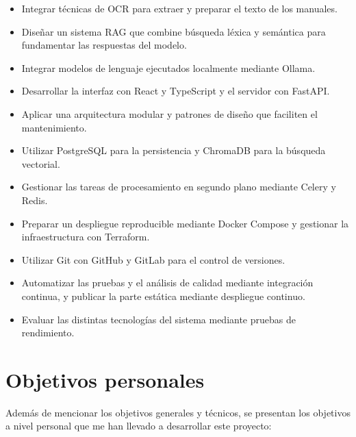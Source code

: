 \begin{itemize}
    \item Integrar técnicas de \acs{OCR} para extraer y preparar el texto
    de los manuales.

    \item Diseñar un sistema \acs{RAG} que combine búsqueda léxica y
    semántica para fundamentar las respuestas del modelo.

    \item Integrar modelos de lenguaje ejecutados localmente mediante
    Ollama.

    \item Desarrollar la interfaz con React y TypeScript y el servidor
    con FastAPI.

    \item Aplicar una arquitectura modular y patrones de diseño que
    faciliten el mantenimiento.

    \item Utilizar PostgreSQL para la persistencia y ChromaDB para la
    búsqueda vectorial.

    \item Gestionar las tareas de procesamiento en segundo plano
    mediante Celery y Redis.

    \item Preparar un despliegue reproducible mediante Docker Compose
    y gestionar la infraestructura con Terraform.

    \item Utilizar Git con GitHub y GitLab para el control de versiones.

    \item Automatizar las pruebas y el análisis de calidad mediante
    integración continua, y publicar la parte estática mediante
    despliegue continuo.

    \item Evaluar las distintas tecnologías del
    sistema mediante pruebas de rendimiento.
\end{itemize}

\section{Objetivos personales}
\label{objetivos:personales}

Además de mencionar los objetivos generales y técnicos, se
presentan los objetivos a nivel personal que me han llevado a
desarrollar este proyecto:

